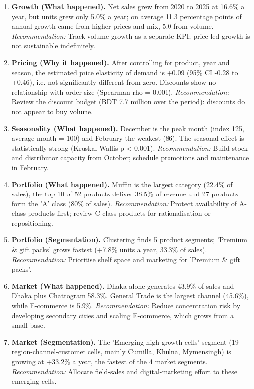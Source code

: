 \begin{enumerate}[leftmargin=*,itemsep=4pt]
\item \textbf{Growth (What happened).} Net sales grew from 2020 to 2025 at 16.6\% a year, but units grew only 5.0\% a year; on average 11.3 percentage points of annual growth came from higher prices and mix, 5.0 from volume. \emph{Recommendation:} Track volume growth as a separate KPI; price-led growth is not sustainable indefinitely.
\item \textbf{Pricing (Why it happened).} After controlling for product, year and season, the estimated price elasticity of demand is +0.09 (95\% CI -0.28 to +0.46), i.e. not significantly different from zero. Discounts show no relationship with order size (Spearman rho = 0.001). \emph{Recommendation:} Review the discount budget (BDT 7.7 million over the period): discounts do not appear to buy volume.
\item \textbf{Seasonality (What happened).} December is the peak month (index 125, average month = 100) and February the weakest (86). The seasonal effect is statistically strong (Kruskal-Wallis p < 0.001). \emph{Recommendation:} Build stock and distributor capacity from October; schedule promotions and maintenance in February.
\item \textbf{Portfolio (What happened).} Muffin is the largest category (22.4\% of sales); the top 10 of 52 products deliver 38.5\% of revenue and 27 products form the 'A' class (80\% of sales). \emph{Recommendation:} Protect availability of A-class products first; review C-class products for rationalisation or repositioning.
\item \textbf{Portfolio (Segmentation).} Clustering finds 5 product segments; 'Premium \& gift packs' grows fastest (+7.8\% units a year, 33.3\% of sales). \emph{Recommendation:} Prioritise shelf space and marketing for 'Premium \& gift packs'.
\item \textbf{Market (What happened).} Dhaka alone generates 43.9\% of sales and Dhaka plus Chattogram 58.3\%. General Trade is the largest channel (45.6\%), while E-commerce is 5.9\%. \emph{Recommendation:} Reduce concentration risk by developing secondary cities and scaling E-commerce, which grows from a small base.
\item \textbf{Market (Segmentation).} The 'Emerging high-growth cells' segment (19 region-channel-customer cells, mainly Cumilla, Khulna, Mymensingh) is growing at +33.2\% a year, the fastest of the 4 market segments. \emph{Recommendation:} Allocate field-sales and digital-marketing effort to these emerging cells.

\end{enumerate}
